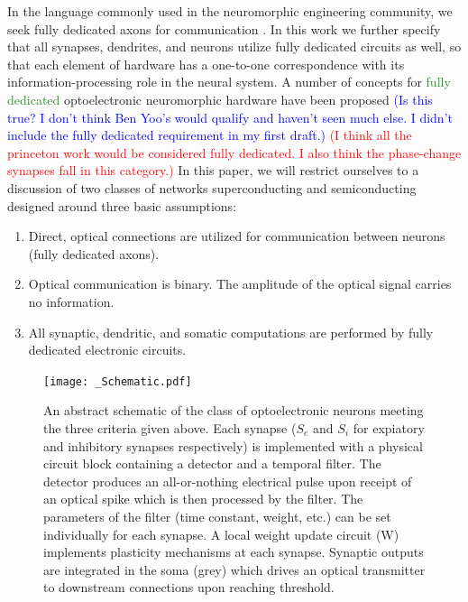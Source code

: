 \documentclass[twocolumn]{article}
\begin{document}
In the language commonly used in the neuromorphic engineering community, we seek fully dedicated axons for communication \cite{seda2016}. In this work we further specify that all synapses, dendrites, and neurons utilize fully dedicated circuits as well, so that each element of hardware has a one-to-one correspondence with its information-processing role in the neural system. A number of concepts for \textcolor{ForestGreen}{fully dedicated} optoelectronic neuromorphic hardware have been proposed \textcolor{blue}{(Is this true? I don't think Ben Yoo's would qualify and haven't seen much else. I didn't include the fully dedicated requirement in my first draft.)} \textcolor{red}{(I think all the princeton work would be considered fully dedicated. I also think the phase-change synapses fall in this category.)} In this paper, we will restrict ourselves to a discussion of two classes of networks \textemdash superconducting and semiconducting \textemdash designed around three basic assumptions:


\begin{enumerate}
    \item Direct, optical connections are utilized for communication between neurons (fully dedicated axons).
    \item Optical communication is binary. The amplitude of the optical signal carries no information.
    \item All synaptic, dendritic, and somatic computations are performed by fully dedicated electronic circuits.
\end{enumerate}

\begin{figure}
    \centering
    \texttt{[image: \_Schematic.pdf]}
    \caption{An abstract schematic of the class of optoelectronic neurons meeting the three criteria given above. Each synapse ($S_e$ and $S_i$ for expiatory and inhibitory synapses respectively) is implemented with a physical circuit block containing a detector and a temporal filter. The detector produces an all-or-nothing electrical pulse upon receipt of an optical spike which is then processed by the filter. The parameters of the filter (time constant, weight, etc.) can be set individually for each synapse. A local weight update circuit (W) implements plasticity mechanisms at each synapse. Synaptic outputs are integrated in the soma (grey) which drives an optical transmitter to downstream connections upon reaching threshold.}
    \label{fig:Schematic}
\end{figure}
\end{document}

